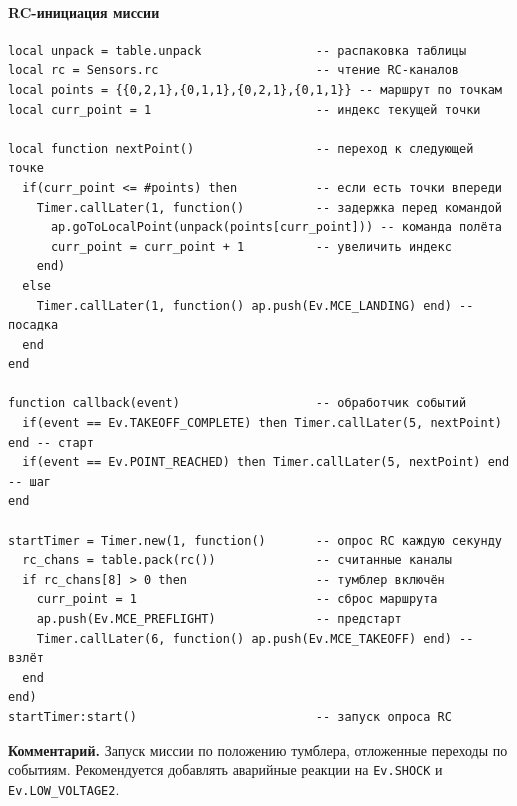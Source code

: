 \paragraph{RC-инициация миссии}
\begin{verbatim}
local unpack = table.unpack                -- распаковка таблицы
local rc = Sensors.rc                      -- чтение RC-каналов
local points = {{0,2,1},{0,1,1},{0,2,1},{0,1,1}} -- маршрут по точкам
local curr_point = 1                       -- индекс текущей точки

local function nextPoint()                 -- переход к следующей точке
  if(curr_point <= #points) then           -- если есть точки впереди
    Timer.callLater(1, function()          -- задержка перед командой
      ap.goToLocalPoint(unpack(points[curr_point])) -- команда полёта
      curr_point = curr_point + 1          -- увеличить индекс
    end)
  else
    Timer.callLater(1, function() ap.push(Ev.MCE_LANDING) end) -- посадка
  end
end

function callback(event)                   -- обработчик событий
  if(event == Ev.TAKEOFF_COMPLETE) then Timer.callLater(5, nextPoint) end -- старт
  if(event == Ev.POINT_REACHED) then Timer.callLater(5, nextPoint) end    -- шаг
end

startTimer = Timer.new(1, function()       -- опрос RC каждую секунду
  rc_chans = table.pack(rc())              -- считанные каналы
  if rc_chans[8] > 0 then                  -- тумблер включён
    curr_point = 1                         -- сброс маршрута
    ap.push(Ev.MCE_PREFLIGHT)              -- предстарт
    Timer.callLater(6, function() ap.push(Ev.MCE_TAKEOFF) end) -- взлёт
  end
end)
startTimer:start()                         -- запуск опроса RC
\end{verbatim}
\textbf{Комментарий.} Запуск миссии по положению тумблера, отложенные переходы по событиям. Рекомендуется добавлять аварийные реакции на \texttt{Ev.SHOCK} и \texttt{Ev.LOW\_VOLTAGE2}.

